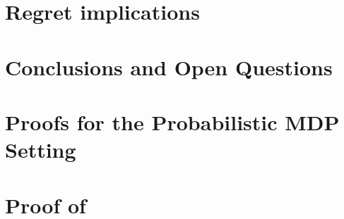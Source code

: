 \documentclass[11pt]{article}
\begin{document}
%

\section{Regret implications}\label{sec:exploit}


\section{Conclusions and Open Questions}\label{sec:conclusions}


\medskip







\appendix

\newpage
\tableofcontents
\newpage


%


\section{Proofs for the Probabilistic MDP Setting \label{sec:proofs_mdps_randomized}}



\newpage

\section{Proof of }
\label{app:exploit}




\end{document}
